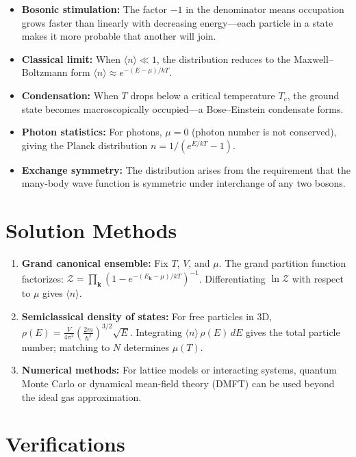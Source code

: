 \documentclass[11pt,openright]{book}
\begin{document}
\begin{itemize}
\item \textbf{Bosonic stimulation:} The factor $-1$ in the denominator means occupation grows faster than linearly with decreasing energy---each particle in a state makes it more probable that another will join.
\item \textbf{Classical limit:} When $\langle n \rangle \ll 1$, the distribution reduces to the Maxwell--Boltzmann form $\langle n \rangle \approx e^{-(E-\mu)/kT}$.
\item \textbf{Condensation:} When $T$ drops below a critical temperature $T_c$, the ground state becomes macroscopically occupied---a Bose--Einstein condensate forms.
\item \textbf{Photon statistics:} For photons, $\mu = 0$ (photon number is not conserved), giving the Planck distribution $n = 1/(e^{E/kT} - 1)$.
\item \textbf{Exchange symmetry:} The distribution arises from the requirement that the many-body wave function is symmetric under interchange of any two bosons.
\end{itemize}
\section*{Solution Methods}

\begin{enumerate}
\item \textbf{Grand canonical ensemble:} Fix $T$, $V$, and $\mu$. The grand partition function factorizes: $\mathcal{Z} = \prod_{\mathbf{k}} (1 - e^{-(E_{\mathbf{k}}-\mu)/kT})^{-1}$. Differentiating $\ln \mathcal{Z}$ with respect to $\mu$ gives $\langle n \rangle$.
\item \textbf{Semiclassical density of states:} For free particles in 3D, $\rho(E) = \frac{V}{4\pi^2}\left(\frac{2m}{\hbar^2}\right)^{3/2} \sqrt{E}$. Integrating $\langle n \rangle \, \rho(E) \, dE$ gives the total particle number; matching to $N$ determines $\mu(T)$.
\item \textbf{Numerical methods:} For lattice models or interacting systems, quantum Monte Carlo or dynamical mean-field theory (DMFT) can be used beyond the ideal gas approximation.
\end{enumerate}
\section*{Verifications}
\end{document}

